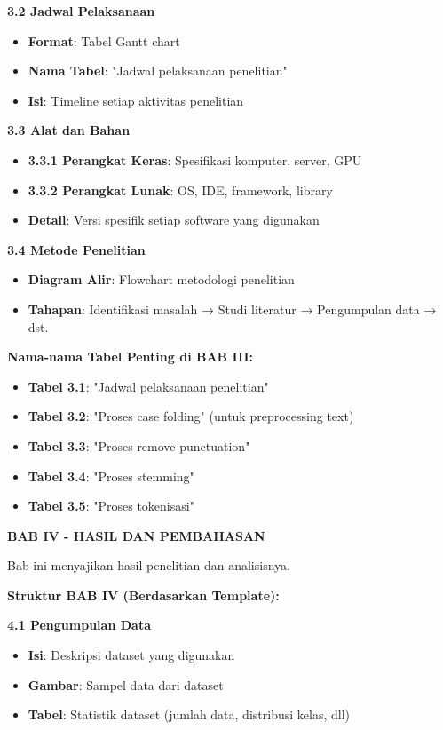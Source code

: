 \textbf{3.2 Jadwal Pelaksanaan}
\begin{itemize}
    \item \textbf{Format}: Tabel Gantt chart
    \item \textbf{Nama Tabel}: "Jadwal pelaksanaan penelitian"
    \item \textbf{Isi}: Timeline setiap aktivitas penelitian
\end{itemize}

\textbf{3.3 Alat dan Bahan}
\begin{itemize}
    \item \textbf{3.3.1 Perangkat Keras}: Spesifikasi komputer, server, GPU
    \item \textbf{3.3.2 Perangkat Lunak}: OS, IDE, framework, library
    \item \textbf{Detail}: Versi spesifik setiap software yang digunakan
\end{itemize}

\textbf{3.4 Metode Penelitian}
\begin{itemize}
    \item \textbf{Diagram Alir}: Flowchart metodologi penelitian
    \item \textbf{Tahapan}: Identifikasi masalah → Studi literatur → Pengumpulan data → dst.
\end{itemize}

\textbf{Nama-nama Tabel Penting di BAB III:}
\begin{itemize}
    \item \textbf{Tabel 3.1}: "Jadwal pelaksanaan penelitian"
    \item \textbf{Tabel 3.2}: "Proses case folding" (untuk preprocessing text)
    \item \textbf{Tabel 3.3}: "Proses remove punctuation"
    \item \textbf{Tabel 3.4}: "Proses stemming"
    \item \textbf{Tabel 3.5}: "Proses tokenisasi"
\end{itemize}

\textbf{BAB IV - HASIL DAN PEMBAHASAN}

Bab ini menyajikan hasil penelitian dan analisisnya.

\textbf{Struktur BAB IV (Berdasarkan Template):}

\textbf{4.1 Pengumpulan Data}
\begin{itemize}
    \item \textbf{Isi}: Deskripsi dataset yang digunakan
    \item \textbf{Gambar}: Sampel data dari dataset
    \item \textbf{Tabel}: Statistik dataset (jumlah data, distribusi kelas, dll)
\end{itemize}

